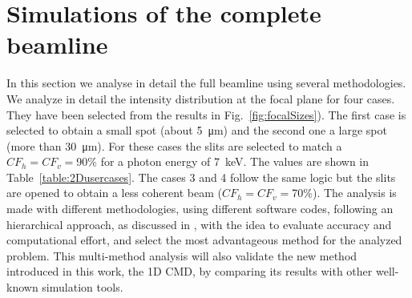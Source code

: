 \documentclass{iucr}              %
\begin{document}


\section{Simulations of the complete beamline}

In this section we analyse in detail the full beamline using several methodologies. We analyze in detail the intensity distribution at the focal plane for four cases. They have been selected from the results in Fig.~\ref{fig:focalSizes}). The first case is selected to obtain a small spot (about \SI{5}{\micro\meter}) and the second one a large spot (more than \SI{30}{\micro\meter}).  For these cases the slits are selected to match a $CF_h=CF_v=$90\% for a photon energy of \SI{7}{keV}. The values are shown in Table~\ref{table:2Dusercases}. The cases 3 and 4 follow the same logic but the slits are opened to obtain a less coherent beam ($CF_h=CF_v=$70\%). The analysis is made with different methodologies, using different software codes, following an hierarchical approach, as discussed in \cite{hierarchical}, with the idea to evaluate accuracy and computational effort, and select the most advantageous method for the analyzed problem. This multi-method analysis will also validate the new method introduced in this work, the 1D CMD, by comparing its results with other well-known simulation tools. 
\end{document}
